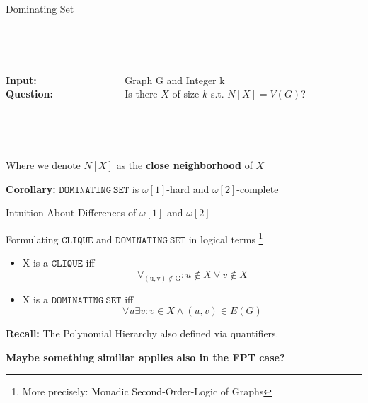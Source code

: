 \begin{frame}[c]{Dominating Set}

\begin{center}
\begin{tcolorbox}[colback=green!5,colframe=green!40!black,title=$\mathtt{DOMINATING~SET}$ (\cite{Cygan2015})]
\begin{columns}[T] %
    \begin{column}{.18\textwidth}
    \\~
    
    \textbf{Input:}\\
    \textbf{Question:}
    \end{column}
    \begin{column}{.78\textwidth}
    \\~
    
    Graph G and Integer k\\
    Is there $X$ of size $k$ s.t. $N[X] = V(G)$?
    
    \end{column}
 \end{columns}
 
\\~

Where we denote $N[X]$ as the \textbf{close neighborhood} of $X$
\end{tcolorbox}
\end{center}

\textbf{Corollary: } $\mathtt{DOMINATING~SET}$ is $\omega[1]$-hard and $\omega[2]$-complete  

\end{frame}

\begin{frame}{Intuition About Differences of $\omega[1]$ and $\omega[2]$}

Formulating $\mathtt{CLIQUE}$ and $\mathtt{DOMINATING~SET}$ in logical terms \footnote{More precisely: Monadic Second-Order-Logic of Graphs}

\begin{center}
\begin{itemize}
    \item X is a $\mathtt{CLIQUE}$ iff $$\forall_{\mathrm{(u,v) \notin G}}: u \notin X \lor v \notin X $$
    \item X is a $\mathtt{DOMINATING~SET}$ iff $$\forall u \exists v: v \in X \land (u,v) \in E(G) $$
\end{itemize}
\end{center}

\textbf{Recall: } The Polynomial Hierarchy also defined via quantifiers. 

\textbf{Maybe something similiar applies also in the FPT case?}

\end{frame}

